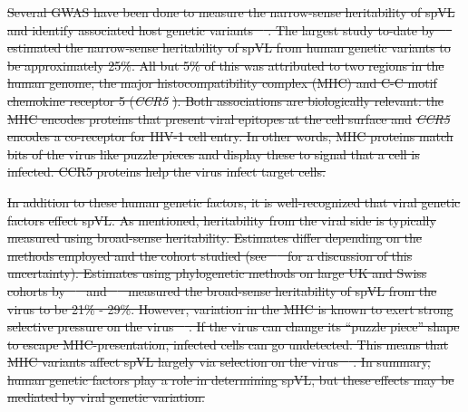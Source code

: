 \documentclass[11pt]{article} %
\providecommand{\DIFdel}[1]{{\protect\color{red}\sout{#1}}}                      %
\begin{document}
\begin{linenumbers}
\DIFdel{Several GWAS have been done to measure the narrow-sense heritability of spVL and identify associated host genetic variants \mbox{%
\citep{Bartha2013, Dalmasso2008, Fellay2007, Pereyra2010, Fellay2009, Pelak2010, VanManen2011, McLaren2012}}\hskip0pt%
. The largest study to-date by \mbox{%
\citet{McLaren2015} }\hskip0pt%
estimated the narrow-sense heritability of spVL from human genetic variants to be approximately 25\%. All but 5\% of this was attributed to two regions in the human genome, the major histocompatibility complex (MHC) and C-C motif chemokine receptor 5 (}\emph{\DIFdel{CCR5}}%
\DIFdel{). Both associations are biologically relevant: the MHC encodes proteins that present viral epitopes at the cell surface and }\emph{\DIFdel{CCR5}} %
\DIFdel{encodes a co-receptor for HIV-1 cell entry. In other words, MHC proteins match bits of the virus like puzzle pieces and display these to signal that a cell is infected. CCR5 proteins help the virus infect target cells.
}%

\DIFdel{In addition to these human genetic factors, it is well-recognized that viral genetic factors effect spVL. As mentioned, heritability from the viral side is typically measured using broad-sense heritability. Estimates differ depending on the methods employed and the cohort studied (see \mbox{%
\citet{Mitov2018} }\hskip0pt%
for a discussion of this uncertainty). Estimates using phylogenetic methods on large UK and Swiss cohorts by \mbox{%
\citep{Mitov2018} }\hskip0pt%
and \mbox{%
\citep{Bertels2018} }\hskip0pt%
measured the broad-sense heritability of spVL from the virus to be 21\% - 29\%. However, variation in the MHC is known to exert strong selective pressure on the virus \mbox{%
\citep{Kloverpris2016, Nguyen2021SystematicLink}}\hskip0pt%
. If the virus can change its ``puzzle piece'' shape to escape MHC-presentation, infected cells can go undetected. This means that MHC variants affect spVL largely via selection on the virus \mbox{%
\citep{Bartha2017}}\hskip0pt%
. In summary, human genetic factors play a role in determining spVL, but these effects may be mediated by viral genetic variation.
}%


\end{linenumbers}
\end{document}
